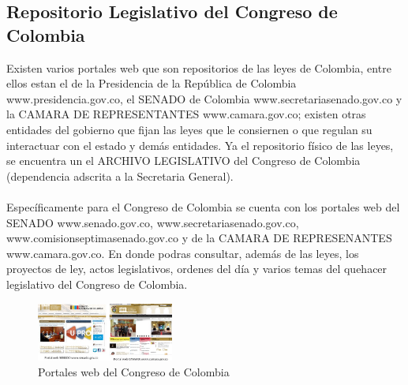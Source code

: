 \documentclass[conference]{IEEEtran}\usepackage[]{graphicx}\usepackage[]{color}
\begin{document}
\subsection{Repositorio Legislativo del Congreso de Colombia}
Existen varios portales web que son repositorios de las leyes de Colombia, entre ellos estan el de la Presidencia de la República de Colombia www.presidencia.gov.co, el SENADO de Colombia www.secretariasenado.gov.co y la CAMARA DE REPRESENTANTES www.camara.gov.co; existen otras entidades del gobierno que fijan las leyes que le consiernen o que regulan su interactuar con el estado y demás entidades. Ya el repositorio físico de las leyes, se encuentra un el ARCHIVO LEGISLATIVO del Congreso de Colombia (dependencia adscrita a la Secretaria General). \\ \\    
Específicamente para el Congreso de Colombia se cuenta con los portales web del SENADO www.senado.gov.co, www.secretariasenado.gov.co, www.comisionseptimasenado.gov.co y de la CAMARA DE REPRESENANTES www.camara.gov.co.  En donde podras consultar, además de las leyes, los proyectos de ley, actos legislativos, ordenes del día y varios temas del quehacer legislativo del Congreso de Colombia.
\begin{figure}[h]
	\centering
	\includegraphics[width=0.4\textwidth]{portales-congreso}
	\caption{Portales web del Congreso de Colombia}
\end{figure}

\end{document}
